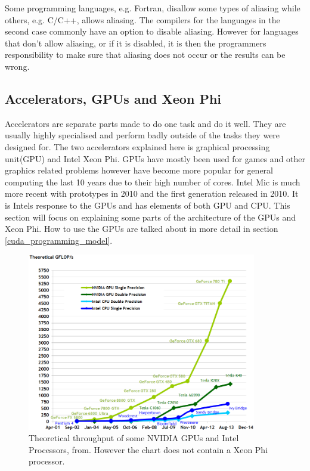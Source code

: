 \documentclass[10pt,a4paper]{report}
\begin{document}
Some programming languages, e.g. Fortran, disallow some types of aliasing while others, e.g. C/C++, allows aliasing\cite{introduction_hpc_hager}. The compilers for the languages in the second case commonly have an option to disable aliasing. However for languages that don't allow aliasing, or if it is disabled, it is then the programmers responsibility to make sure that aliasing does not occur or the results can be wrong\cite{introduction_hpc_hager}.

\subsection{Accelerators, GPUs and Xeon Phi}
\label{gpu}
Accelerators are separate parts made to do one task and do it well. They are usually highly specialised and perform badly outside of the tasks they were designed for. The two accelerators explained here is graphical processing unit(GPU) and Intel Xeon Phi\cite{cuda, jeffers2013intel}. GPUs have mostly been used for games and other graphics related problems however have become more popular for general computing the last 10 years due to their high number of cores\cite{cuda}.  Intel Mic is much more recent with prototypes in 2010 and the first generation released in 2010\cite{jeffers2013intel}. It is Intels response to the GPUs and has elements of both GPU and CPU\cite{jeffers2013intel}. This section will focus on explaining some parts of the architecture of the GPUs and Xeon Phi. How to use the GPUs are talked about in more detail in section \ref{cuda_programming_model}.

\begin{figure}[h]
    \centering
    \includegraphics[width=10cm]{floating-point-operations-per-second.png}
    \caption{Theoretical throughput of some NVIDIA GPUs and Intel Processors, from\cite{cuda}. However the chart does not contain a Xeon Phi processor.}
    \label{fig:gpu_vs_cpu}
\end{figure}
\end{document}
